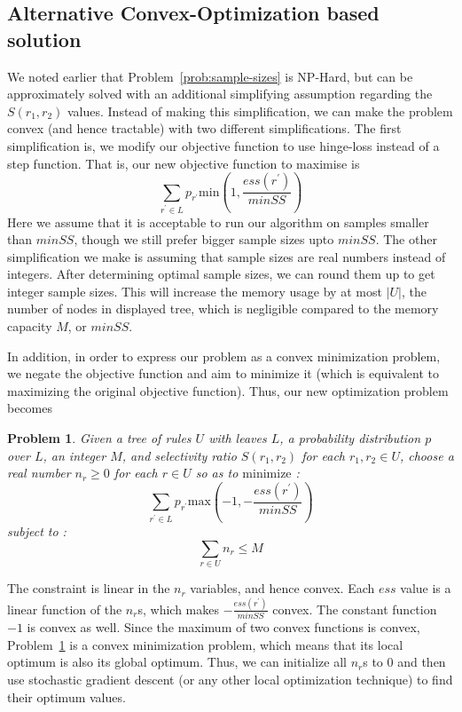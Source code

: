 \documentclass[10pt,journal,compsoc]{IEEEtran}
\newcounter{prob}
\newtheorem{problem}[prob]{Problem}
\newcommand{\techreporttext}[1]{#1}
\begin{document}
\techreporttext{
\subsection{Alternative Convex-Optimization based solution}\label{sec:alternative-convex}
We noted earlier that Problem~\ref{prob:sample-sizes} is NP-Hard, but can be approximately solved with an additional simplifying assumption regarding the $S(r_1, r_2)$ values. Instead of making this simplification, we can make the problem convex (and hence tractable) with two different simplifications. The first simplification is, we modify our objective function to use hinge-loss instead of a step function. That is, our new objective function to maximise is $$\sum_{r^{\prime} \in L} p_{r^{\prime}}\textrm{min}\left(1, \frac{ess(r^{\prime})}{minSS}\right)$$
Here we assume that it is acceptable to run our algorithm on samples smaller than $minSS$, though we still prefer bigger sample sizes upto $minSS$. The other simplification we make is assuming that sample sizes are real numbers instead of integers. After determining optimal sample sizes, we can round them up to get integer sample sizes. This will increase the memory usage by at most $|U|$, the number of nodes in displayed tree, which is negligible compared to the memory capacity $M$, or $minSS$.

In addition, in order to express our problem as a convex minimization problem, we negate the objective function and aim to minimize it (which is equivalent to maximizing the original objective function). Thus, our new optimization problem becomes
\begin{problem}\label{prob:sample-sizes-hinge-loss}
Given a tree of rules $U$ with leaves $L$, a probability distribution $p$ over $L$, an integer $M$, and selectivity ratio $S(r_1, r_2)$ for each $r_1, r_2 \in U$, 
choose a real number $n_r \geq 0$ for each $r \in U$ so as to $\textrm{minimize}$ :
$$\sum_{r^{\prime} \in L} p_{r^{\prime}}\textrm{max}\left(-1, -\frac{ess(r^{\prime})}{minSS}\right) $$
subject to :
$$\sum_{r \in U} n_r \leq M$$
\end{problem}
The constraint is linear in the $n_r$ variables, and hence convex. Each $ess$ value is a linear function of the $n_r$s, which makes $-\frac{ess(r^{\prime})}{minSS}$ convex. The constant function $-1$ is convex as well. Since the maximum of two convex functions is convex, Problem~\ref{prob:sample-sizes-hinge-loss} is a convex minimization problem, which means that its local optimum is also its global optimum. Thus, we can initialize all $n_r$s to $0$ and then use stochastic gradient descent (or any other local optimization technique) to find their optimum values. 

}
\end{document}
